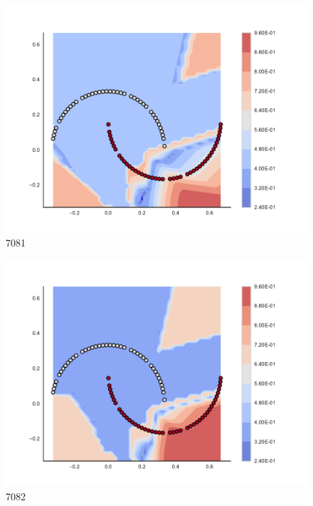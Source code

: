 \begin{subfigure}[b]{0.09\textwidth}
    \includegraphics[clip, trim=2.35cm 1.75cm 4.5cm 0cm,width=\textwidth]{img/convergence/7081.pdf}
    \caption{7081}
    \label{fig:convergence_7081}
\end{subfigure}
%
\begin{subfigure}[b]{0.09\textwidth}
    \includegraphics[clip, trim=2.35cm 1.75cm 4.5cm 0cm,width=\textwidth]{img/convergence/7082.pdf}
    \caption{7082}
    \label{fig:convergence_7082}
\end{subfigure}
%
